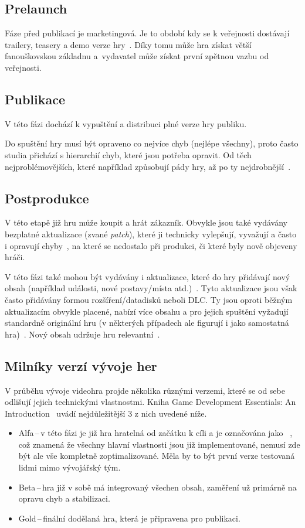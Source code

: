 \subsection*{Prelaunch}
Fáze před publikací je marketingová. Je to období kdy se k veřejnosti dostávají trailery, teasery a demo verze hry~\cite{GameMaker_development}. Díky tomu může hra získat větší fanouškovskou základnu a~vydavatel může získat první zpětnou vazbu od veřejnosti.

\subsection*{Publikace}
V této fázi dochází k vypuštění a distribuci plné verze hry publiku.

Do spuštění hry musí být opraveno co nejvíce chyb (nejlépe všechny), proto často studia přichází s hierarchií chyb, které jsou potřeba opravit. Od těch nejproblémovějších, které například způsobují pády hry, až po ty nejdrobnější~\cite{g2_game_development}.

\subsection*{Postprodukce}
V této etapě již hru může koupit a hrát zákazník. Obvykle  jsou také vydávány bezplatné aktualizace (zvané \textit{patch}), které ji technicky vylepšují, vyvažují a často i opravují chyby~\cite{novak2011game}, na které se nedostalo při produkci, či které byly nově objeveny hráči. 

V této fázi také mohou být vydávány i aktualizace, které do hry přidávají nový obsah (například události, nové postavy/místa atd.)~\cite{g2_game_development}. Tyto aktualizace jsou však často přidávány formou rozšíření/datadisků neboli DLC. Ty jsou oproti běžným aktualizacím obvykle placené, nabízí více obsahu a pro jejich spuštění vyžadují standardně originální hru (v některých případech ale figurují i jako samostatná hra)~\cite{novak2011game}. Nový obsah udržuje hru relevantní~\cite{GameMaker_development}.

\subsection*{Milníky verzí vývoje her}
V průběhu vývoje videohra projde několika různými verzemi, které se od sebe odlišují jejich technickými vlastnostmi. Kniha Game Development Essentials: An Introduction~\cite{novak2011game} uvádí nejdůležitější 3 z nich uvedené níže.
\begin{itemize}
    \item Alfa\,--\,v této fázi je již hra hratelná od začátku k cíli a je označována jako \textit{}~\cite{CG_Spectrum_GAMEDEVELOPMENT}, což znamená že všechny hlavní vlastnosti jsou již implementované, nemusí zde být ale vše kompletně zoptimalizované. Měla by to být první verze testovaná lidmi mimo vývojářský tým.
    \item Beta\,--\,hra již v sobě má integrovaný všechen obsah, zaměření už primárně na opravu chyb a stabilizaci.
    \item Gold\,--\,finální dodělaná hra, která je připravena pro publikaci.
\end{itemize}

